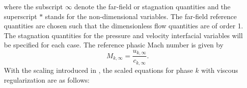 \documentclass[preprint,10pt]{elsarticle}
\begin{document}
%
where  the subscript $\infty$ denote the far-field or stagnation quantities and the superscript $*$ stands for the non-dimensional variables. The far-field reference quantities are chosen such that the dimensionless flow quantities are of order 1. The stagnation quantities for the pressure and velocity interfacial variables will be specified for each case. The reference phasic Mach number is given by
%
\begin{equation}
M_{k,\infty} = \frac{u_{k,\infty}}{c_{k,\infty}}.
\end{equation}
%
With the scaling introduced in , the scaled equations for phase $k$ with viscous regularization are as follows:
% 
\end{document}

